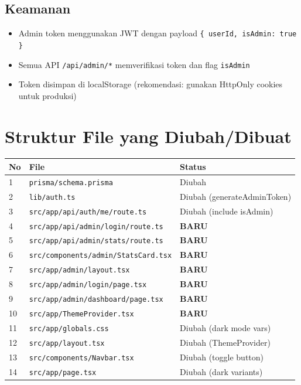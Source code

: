 \documentclass[12pt, a4paper]{article}
\begin{document}
\subsection{Keamanan}
\begin{itemize}
  \item Admin token menggunakan JWT dengan payload \texttt{\{ userId, isAdmin: true \}}
  \item Semua API \texttt{/api/admin/*} memverifikasi token dan flag \texttt{isAdmin}
  \item Token disimpan di localStorage (rekomendasi: gunakan HttpOnly cookies untuk produksi)
\end{itemize}

\section{Struktur File yang Diubah/Dibuat}

\begin{tabular}{|l|l|l|}
\hline
\textbf{No} & \textbf{File} & \textbf{Status} \\
\hline
1 & \texttt{prisma/schema.prisma} & Diubah \\
2 & \texttt{lib/auth.ts} & Diubah (generateAdminToken) \\
3 & \texttt{src/app/api/auth/me/route.ts} & Diubah (include isAdmin) \\
4 & \texttt{src/app/api/admin/login/route.ts} & \textbf{BARU} \\
5 & \texttt{src/app/api/admin/stats/route.ts} & \textbf{BARU} \\
6 & \texttt{src/components/admin/StatsCard.tsx} & \textbf{BARU} \\
7 & \texttt{src/app/admin/layout.tsx} & \textbf{BARU} \\
8 & \texttt{src/app/admin/login/page.tsx} & \textbf{BARU} \\
9 & \texttt{src/app/admin/dashboard/page.tsx} & \textbf{BARU} \\
10 & \texttt{src/app/ThemeProvider.tsx} & \textbf{BARU} \\
11 & \texttt{src/app/globals.css} & Diubah (dark mode vars) \\
12 & \texttt{src/app/layout.tsx} & Diubah (ThemeProvider) \\
13 & \texttt{src/components/Navbar.tsx} & Diubah (toggle button) \\
14 & \texttt{src/app/page.tsx} & Diubah (dark variants) \\
\hline
\end{tabular}
\end{document}
